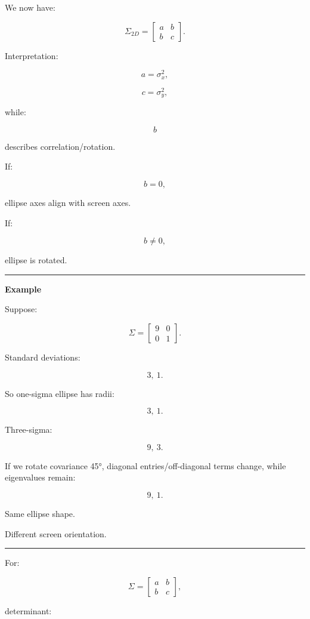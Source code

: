We now have:

\[
\boxed{
\Sigma_{2D}
=
\begin{bmatrix}
a&b\\
b&c
\end{bmatrix}.
}
\]

Interpretation:

\[
a=\sigma_x^2,
\]

\[
c=\sigma_y^2,
\]

while:

\[
b
\]

describes correlation/rotation.

If:

\[
b=0,
\]

ellipse axes align with screen axes.

If:

\[
b\ne0,
\]

ellipse is rotated.

\begin{center}\rule{0.5\linewidth}{0.5pt}\end{center}

\textbf{Example}

Suppose:

\[
\Sigma=
\begin{bmatrix}
9&0\\
0&1
\end{bmatrix}.
\]

Standard deviations:

\[
3,\ 1.
\]

So one-sigma ellipse has radii:

\[
3,\ 1.
\]

Three-sigma:

\[
9,\ 3.
\]

If we rotate covariance 45°, diagonal entries/off-diagonal terms change, while eigenvalues remain:

\[
9,\ 1.
\]

Same ellipse shape.

Different screen orientation.

\begin{center}\rule{0.5\linewidth}{0.5pt}\end{center}

For:

\[
\Sigma=
\begin{bmatrix}
a&b\\
b&c
\end{bmatrix},
\]

determinant:

